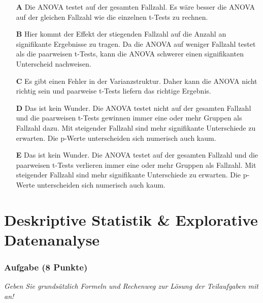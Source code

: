 \documentclass[a4paper, 9pt]{scrartcl}\usepackage[]{graphicx}\usepackage[]{xcolor}
\begin{document}
\begin{enumerate}
\item [\textbf{A} \msquare] Die ANOVA testet auf der gesamten Fallzahl. Es wäre besser die ANOVA auf der gleichen Fallzahl wie die einzelnen t-Tests zu rechnen.
\item [\textbf{B} \msquare] Hier kommt der Effekt der stiegenden Fallzahl auf die Anzahl an signifikante Ergebnisse zu tragen. Da die ANOVA auf weniger Fallzahl testet als die paarweisen t-Tests, kann die ANOVA schwerer einen signifikanten Unterscheid nachweisen.
\item [\textbf{C} \msquare] Es gibt einen Fehler in der Varianzstruktur. Daher kann die ANOVA nicht richtig sein und paarweise t-Tests liefern das richtige Ergebnis.
\item [\textbf{D} \msquare] Das ist kein Wunder. Die ANOVA testet nicht auf der gesamten Fallzahl und die paarweisen t-Tests gewinnen immer eine oder mehr Gruppen als Fallzahl dazu. Mit steigender Fallzahl sind mehr signifikante Unterschiede zu erwarten. Die p-Werte unterscheiden sich numerisch auch kaum.
\item [\textbf{E} \msquare] Das ist kein Wunder. Die ANOVA testet auf der gesamten Fallzahl und die paarweisen t-Tests verlieren immer eine oder mehr Gruppen als Fallzahl. Mit steigender Fallzahl sind mehr signifikante Unterschiede zu erwarten. Die p-Werte unterscheiden sich numerisch auch kaum.
\end{enumerate}
    
\clearpage
\part{Deskriptive Statistik \& Explorative Datenanalyse}

\section{Aufgabe \hfill (8 Punkte)}

\textit{Geben Sie grundsätzlich Formeln und Rechenweg zur Lösung der Teilaufgaben mit an!} \\[1Ex]
 
\end{document}
